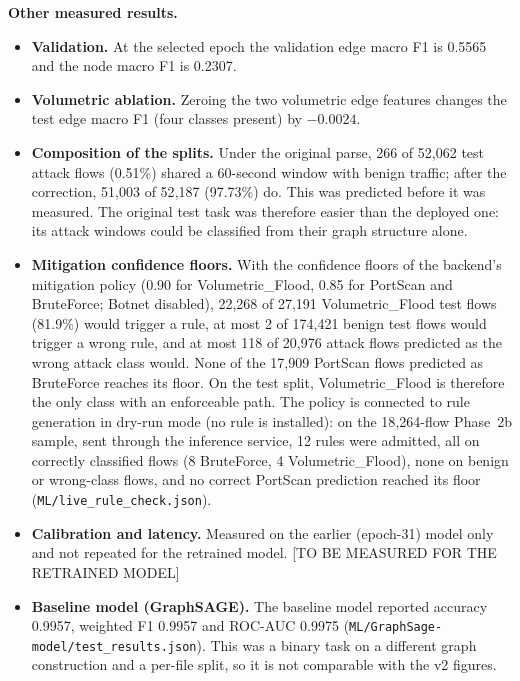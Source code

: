 \documentclass[12pt,a4paper]{report}
\begin{document}
\par\textbf{Other measured results.}
\begin{itemize}
    \item \textbf{Validation.} At the selected epoch the validation edge macro F1 is 0.5565 and the node macro F1 is 0.2307.
    \item \textbf{Volumetric ablation.} Zeroing the two volumetric edge features changes the test edge macro F1 (four classes present) by $-0.0024$.
    \item \textbf{Composition of the splits.} Under the original parse, 266 of 52{,}062 test attack flows (0.51\%) shared a 60-second window with benign traffic; after the correction, 51{,}003 of 52{,}187 (97.73\%) do. This was predicted before it was measured. The original test task was therefore easier than the deployed one: its attack windows could be classified from their graph structure alone.
    \item \textbf{Mitigation confidence floors.} With the confidence floors of the backend's mitigation policy (0.90 for Volumetric\_Flood, 0.85 for PortScan and BruteForce; Botnet disabled), 22{,}268 of 27{,}191 Volumetric\_Flood test flows (81.9\%) would trigger a rule, at most 2 of 174{,}421 benign test flows would trigger a wrong rule, and at most 118 of 20{,}976 attack flows predicted as the wrong attack class would. None of the 17{,}909 PortScan flows predicted as BruteForce reaches its floor. On the test split, Volumetric\_Flood is therefore the only class with an enforceable path. The policy is connected to rule generation in dry-run mode (no rule is installed): on the 18{,}264-flow Phase~2b sample, sent through the inference service, 12 rules were admitted, all on correctly classified flows (8 BruteForce, 4 Volumetric\_Flood), none on benign or wrong-class flows, and no correct PortScan prediction reached its floor (\texttt{ML/\allowbreak{}live\_\allowbreak{}rule\_\allowbreak{}check.\allowbreak{}json}).
    \item \textbf{Calibration and latency.} Measured on the earlier (epoch-31) model only and not repeated for the retrained model. [TO BE MEASURED FOR THE RETRAINED MODEL]
    \item \textbf{Baseline model (GraphSAGE).} The baseline model reported accuracy 0.9957, weighted F1 0.9957 and ROC-AUC 0.9975 (\texttt{ML/\allowbreak{}GraphSage-model/\allowbreak{}test\_\allowbreak{}results.\allowbreak{}json}). This was a binary task on a different graph construction and a per-file split, so it is not comparable with the v2 figures.
\end{itemize}
\end{document}
